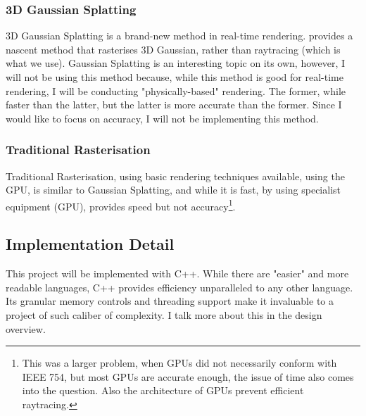 \documentclass[../main.tex]{subfiles}
\begin{document}
\subsubsection{3D Gaussian Splatting}
3D Gaussian Splatting is a brand-new method in real-time rendering.\cite{kerbl_3d_2023} provides a nascent method that rasterises 3D Gaussian, rather than raytracing (which is what we use). Gaussian Splatting is an interesting topic on its own, however, I will not be using this method because, while this method is good for real-time rendering, I will be conducting "physically-based" rendering. The former, while faster than the latter, but the latter is more accurate than the former. Since I would like to focus on accuracy, I will not be implementing this method.
\subsubsection{Traditional Rasterisation}
Traditional Rasterisation, using basic rendering techniques available, using the GPU, is similar to Gaussian Splatting, and while it is fast, by using specialist equipment (GPU), provides speed but not accuracy\footnote{This was a larger problem, when GPUs did not necessarily conform with IEEE 754, but most GPUs are accurate enough, the issue of time also comes into the question. Also the architecture of GPUs prevent efficient raytracing.}. 

\subsection{Implementation Detail}
This project will be implemented with C++. While there are "easier" and more readable languages, C++ provides efficiency unparalleled to any other language. Its granular memory controls and threading support make it invaluable to a project of such caliber of complexity. I talk more about this in the design overview.
\end{document}
